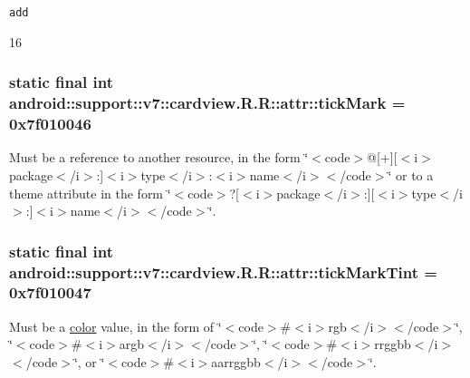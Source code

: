 {\tt add}

16\hypertarget{classandroid_1_1support_1_1v7_1_1cardview_1_1_r_1_1attr_750a86fb7bf444011fd945896105e108}{
\subsubsection[{tickMark}]{\setlength{\rightskip}{0pt plus 5cm}static final int android::support::v7::cardview.R.R::attr::tickMark = 0x7f010046}}
\label{classandroid_1_1support_1_1v7_1_1cardview_1_1_r_1_1attr_750a86fb7bf444011fd945896105e108}


Must be a reference to another resource, in the form \char`\"{}$<$code$>$@\mbox{[}+\mbox{]}\mbox{[}$<$i$>$package$<$/i$>$:\mbox{]}$<$i$>$type$<$/i$>$:$<$i$>$name$<$/i$>$$<$/code$>$\char`\"{} or to a theme attribute in the form \char`\"{}$<$code$>$?\mbox{[}$<$i$>$package$<$/i$>$:\mbox{]}\mbox{[}$<$i$>$type$<$/i$>$:\mbox{]}$<$i$>$name$<$/i$>$$<$/code$>$\char`\"{}. \hypertarget{classandroid_1_1support_1_1v7_1_1cardview_1_1_r_1_1attr_cb7b63e6c61f181e5acef651650c69a1}{
\subsubsection[{tickMarkTint}]{\setlength{\rightskip}{0pt plus 5cm}static final int android::support::v7::cardview.R.R::attr::tickMarkTint = 0x7f010047}}
\label{classandroid_1_1support_1_1v7_1_1cardview_1_1_r_1_1attr_cb7b63e6c61f181e5acef651650c69a1}


Must be a \hyperlink{classandroid_1_1support_1_1v7_1_1cardview_1_1_r_1_1color}{color} value, in the form of \char`\"{}$<$code$>$\#$<$i$>$rgb$<$/i$>$$<$/code$>$\char`\"{}, \char`\"{}$<$code$>$\#$<$i$>$argb$<$/i$>$$<$/code$>$\char`\"{}, \char`\"{}$<$code$>$\#$<$i$>$rrggbb$<$/i$>$$<$/code$>$\char`\"{}, or \char`\"{}$<$code$>$\#$<$i$>$aarrggbb$<$/i$>$$<$/code$>$\char`\"{}. 

